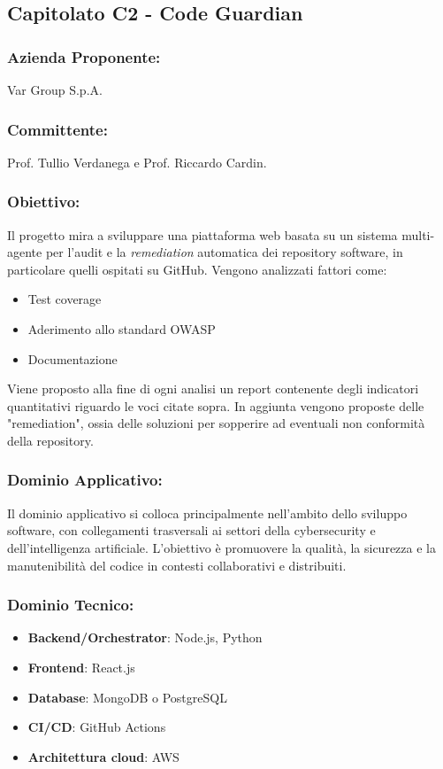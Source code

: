 \documentclass[a4paper,12pt]{article}
\begin{document}
\subsection{Capitolato C2 - Code Guardian}
\subsubsection*{Azienda Proponente:} Var Group S.p.A.
\subsubsection*{Committente:} Prof. Tullio Verdanega e Prof. Riccardo Cardin.
\subsubsection*{Obiettivo:} Il progetto mira a sviluppare una piattaforma web basata su un sistema multi-agente per l'audit e la \textit{remediation} automatica dei repository software, in particolare quelli ospitati su GitHub. Vengono analizzati fattori come:
\begin{itemize}
    \item Test coverage
    \item Aderimento allo standard OWASP
    \item Documentazione
\end{itemize}
Viene proposto alla fine di ogni analisi un report contenente degli indicatori quantitativi riguardo le voci citate sopra. In aggiunta vengono proposte delle "remediation", ossia delle soluzioni per sopperire ad eventuali non conformità della repository.
\subsubsection*{Dominio Applicativo:} Il dominio applicativo si colloca principalmente nell'ambito dello sviluppo software, con collegamenti trasversali ai settori della cybersecurity e dell'intelligenza artificiale. L'obiettivo è promuovere la qualità, la sicurezza e la manutenibilità del codice in contesti collaborativi e distribuiti.
\subsubsection*{Dominio Tecnico:}
\begin{itemize}
    \item \textbf{Backend/Orchestrator}: Node.js, Python
    \item \textbf{Frontend}: React.js
    \item \textbf{Database}: MongoDB o PostgreSQL
    \item \textbf{CI/CD}: GitHub Actions
    \item \textbf{Architettura cloud}: AWS
\end{itemize}
\end{document}
